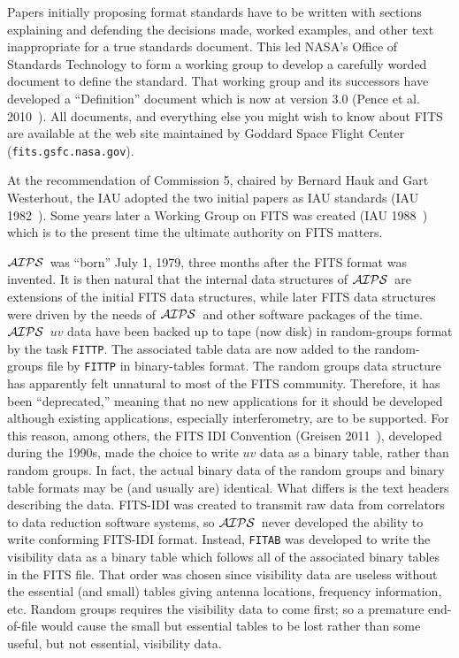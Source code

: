 \documentclass[twoside]{article}
\newcommand{\AIPS}{{$\cal AIPS\/$}}
\begin{document}
Papers initially proposing format standards have to be written with
sections explaining and defending the decisions made, worked examples,
and other text inappropriate for a true standards document.  This led
NASA's Office of Standards Technology to form a working group to
develop a carefully worded document to define the standard.  That
working group and its successors have developed a ``Definition''
document which is now at version 3.0 (Pence et al.
2010~\cite{PCPSS10}).  All documents, and everything else you might
wish to know about FITS are available at the web site maintained by
Goddard Space Flight Center ({\tt fits.gsfc.nasa.gov}).

At the recommendation of Commission 5, chaired by Bernard Hauk and
Gart Westerhout, the IAU adopted the two initial papers as IAU
standards (IAU 1982~\cite{IAU82}).  Some years later a Working Group on
FITS was created (IAU 1988~\cite{IAU88}) which is to the present time
the ultimate authority on FITS matters.

\AIPS\ was ``born'' July 1, 1979, three months after the FITS format
was invented.  It is then natural that the internal data structures of
\AIPS\ are extensions of the initial FITS data structures, while later
FITS data structures were driven by the needs of \AIPS\ and other
software packages of the time.  \AIPS\ $uv$ data have been backed up
to tape (now disk) in random-groups format by the task {\tt FITTP}\@.
The associated table data are now added to the random-groups file by
{\tt FITTP} in binary-tables format.  The random groups data structure
has apparently felt unnatural to most of the FITS community.
Therefore, it has been ``deprecated,'' meaning that no new
applications for it should be developed although existing
applications, especially interferometry, are to be supported.  For
this reason, among others, the FITS IDI Convention (Greisen
2011~\cite{G11}), developed during the 1990s, made the choice to write
$uv$ data as a binary table, rather than random groups.  In fact, the
actual binary data of the random groups and binary table formats may
be (and usually are) identical.  What differs is the text headers
describing the data.  FITS-IDI was created to transmit raw data from
correlators to data reduction software systems, so \AIPS\ never
developed the ability to write conforming FITS-IDI format.  Instead,
{\tt FITAB} was developed to write the visibility data as a binary
table which follows all of the associated binary tables in the FITS
file.  That order was chosen since visibility data are useless without
the essential (and small) tables giving antenna locations, frequency
information, etc.  Random groups requires the visibility data to come
first; so a premature end-of-file would cause the small but essential
tables to be lost rather than some useful, but not essential,
visibility data.
\end{document}
